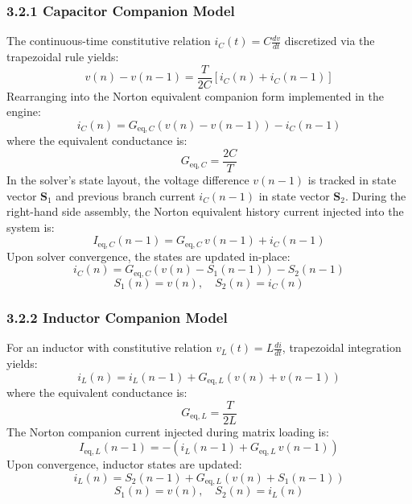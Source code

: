 \documentclass[fleqn,draft]{jaes}
\begin{document}
\subsubsection{3.2.1 Capacitor Companion Model}
The continuous-time constitutive relation $i_C(t) = C \frac{dv}{dt}$ discretized via the trapezoidal rule yields:
\begin{equation}
v(n) - v(n-1) = \frac{T}{2C} \left[ i_C(n) + i_C(n-1) \right]
\end{equation}
Rearranging into the Norton equivalent companion form implemented in the engine:
\begin{equation}
i_C(n) = G_{\text{eq}, C} \left( v(n) - v(n-1) \right) - i_C(n-1)
\end{equation}
where the equivalent conductance is:
\begin{equation}
G_{\text{eq}, C} = \frac{2C}{T}
\end{equation}
In the solver's state layout, the voltage difference $v(n-1)$ is tracked in state vector $\mathbf{S}_1$ and previous branch current $i_C(n-1)$ in state vector $\mathbf{S}_2$. During the right-hand side assembly, the Norton equivalent history current injected into the system is:
\begin{equation}
I_{\text{eq}, C}(n-1) = G_{\text{eq}, C} \, v(n-1) + i_C(n-1)
\end{equation}
Upon solver convergence, the states are updated in-place:
\begin{equation}
i_C(n) = G_{\text{eq}, C} \left( v(n) - S_1(n-1) \right) - S_2(n-1)
\end{equation}
\begin{equation}
S_1(n) = v(n), \quad S_2(n) = i_C(n)
\end{equation}

\subsubsection{3.2.2 Inductor Companion Model}
For an inductor with constitutive relation $v_L(t) = L \frac{di}{dt}$, trapezoidal integration yields:
\begin{equation}
i_L(n) = i_L(n-1) + G_{\text{eq}, L} \left( v(n) + v(n-1) \right)
\end{equation}
where the equivalent conductance is:
\begin{equation}
G_{\text{eq}, L} = \frac{T}{2L}
\end{equation}
The Norton companion current injected during matrix loading is:
\begin{equation}
I_{\text{eq}, L}(n-1) = -(i_L(n-1) + G_{\text{eq}, L} \, v(n-1))
\end{equation}
Upon convergence, inductor states are updated:
\begin{equation}
i_L(n) = S_2(n-1) + G_{\text{eq}, L} \left( v(n) + S_1(n-1) \right)
\end{equation}
\begin{equation}
S_1(n) = v(n), \quad S_2(n) = i_L(n)
\end{equation}
\end{document}
